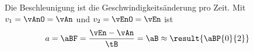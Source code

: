 Die Beschleunigung ist die Geschwindigkeitsänderung pro Zeit. Mit $v_1 = \vAnO = \vAn$ und $v_2 = \vEnO = \vEn$ ist
\begin{align}
 a &= \aBF = \frac{\vEn-\vAn}{\tB} = \aB \approx \result{\aBP{0}{2}}
\end{align}
